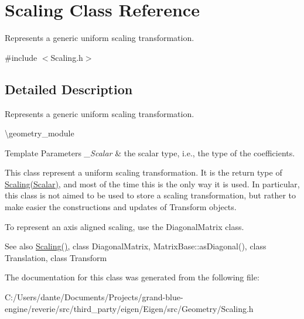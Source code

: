 \hypertarget{class_scaling}{}\section{Scaling Class Reference}
\label{class_scaling}


Represents a generic uniform scaling transformation.  




{\ttfamily \#include $<$Scaling.\+h$>$}



\subsection{Detailed Description}
Represents a generic uniform scaling transformation. 

\textbackslash{}geometry\+\_\+module


\begin{DoxyTemplParams}{Template Parameters}
{\em \+\_\+\+Scalar} & the scalar type, i.\+e., the type of the coefficients.\\
\hline
\end{DoxyTemplParams}
This class represent a uniform scaling transformation. It is the return type of \mbox{\hyperlink{class_scaling}{Scaling(\+Scalar)}}, and most of the time this is the only way it is used. In particular, this class is not aimed to be used to store a scaling transformation, but rather to make easier the constructions and updates of Transform objects.

To represent an axis aligned scaling, use the Diagonal\+Matrix class.

\begin{DoxySeeAlso}{See also}
\mbox{\hyperlink{group___geometry___module_ga109425bca2048c3df19249c04e73715c}{Scaling()}}, class Diagonal\+Matrix, Matrix\+Base\+::as\+Diagonal(), class Translation, class Transform 
\end{DoxySeeAlso}


The documentation for this class was generated from the following file\+:\begin{DoxyCompactItemize}
\item 
C\+:/\+Users/dante/\+Documents/\+Projects/grand-\/blue-\/engine/reverie/src/third\+\_\+party/eigen/\+Eigen/src/\+Geometry/Scaling.\+h\end{DoxyCompactItemize}
